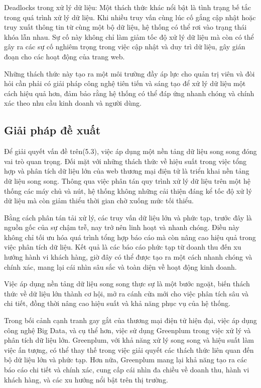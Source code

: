 \documentclass{article}[14pt]
\begin{document}
{Deadlocks trong xử lý dữ liệu:
Một thách thức khác nổi bật là tình trạng bế tắc trong quá trình xử lý dữ liệu. Khi nhiều truy vấn cùng lúc cố gắng cập nhật hoặc truy xuất thông tin từ cùng một bộ dữ liệu, hệ thống có thể rơi vào trạng thái khóa lẫn nhau. Sự cố này không chỉ làm giảm tốc độ xử lý dữ liệu mà còn có thể gây ra các sự cố nghiêm trọng trong việc cập nhật và duy trì dữ liệu, gây gián đoạn cho các hoạt động của trang web.

Những thách thức này tạo ra một môi trường đầy áp lực cho quản trị viên và đòi hỏi cần phải có giải pháp công nghệ tiên tiến và sáng tạo để xử lý dữ liệu một cách hiệu quả hơn, đảm bảo rằng hệ thống có thể đáp ứng nhanh chóng và chính xác theo nhu cầu kinh doanh và người dùng.




\subsection{Giải pháp đề xuất}
Để giải quyết vấn đề trên(5.3), việc áp dụng một nền tảng dữ liệu song song đóng vai trò quan trọng. Đối mặt với những thách thức về hiệu suất trong việc tổng hợp và phân tích dữ liệu lớn của web thương mại điện tử là triển khai nền tảng dữ liệu song song. Thông qua việc phân tán quy trình xử lý dữ liệu trên một hệ thống các máy chủ và nút, hệ thống không những cải thiện đáng kể tốc độ xử lý dữ liệu mà còn giảm thiểu thời gian chờ xuống mức tối thiểu.

Bằng cách phân tán tải xử lý, các truy vấn dữ liệu lớn và phức tạp, trước đây là nguồn gốc của sự chậm trễ, nay trở nên linh hoạt và nhanh chóng. Điều này không chỉ tối ưu hóa quá trình tổng hợp báo cáo mà còn nâng cao hiệu quả trong việc phân tích dữ liệu. Kết quả là các báo cáo phức tạp từ doanh thu đến xu hướng hành vi khách hàng, giờ đây có thể được tạo ra một cách nhanh chóng và chính xác, mang lại cái nhìn sâu sắc và toàn diện về hoạt động kinh doanh.

Việc áp dụng nền tảng dữ liệu song song thực sự là một bước ngoặt, biến thách thức về dữ liệu lớn thành cơ hội, mở ra cánh cửa mới cho việc phân tích sâu và chi tiết, đồng thời nâng cao hiệu suất và khả năng phục vụ của hệ thống.

Trong bối cảnh cạnh tranh gay gắt của thương mại điện tử hiện đại, việc áp dụng công nghệ Big Data, và cụ thể hơn, việc sử dụng Greenplum trong việc xử lý và phân tích dữ liệu lớn. Greenplum, với khả năng xử lý song song và hiệu suất làm việc ấn tượng, có thể thay thế trong việc giải quyết các thách thức liên quan đến bộ dữ liệu lớn và phức tạp. Hơn nữa, Greenplum mang lại khả năng tạo ra các báo cáo chi tiết và chính xác, cung cấp cái nhìn đa chiều về doanh thu, hành vi khách hàng, và các xu hướng nổi bật trên thị trường.

}
\end{document}
